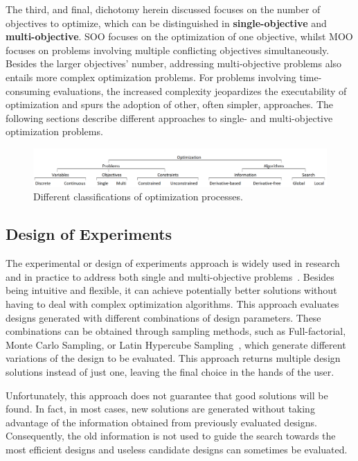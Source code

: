 	The third, and final, dichotomy herein discussed focuses on the number of objectives to optimize, which can be distinguished in \textbf{single-objective} and \textbf{multi-objective}. \ac{SOO} focuses on the optimization of one objective, whilst \ac{MOO} focuses on problems involving multiple conflicting objectives simultaneously. Besides the larger objectives' number, addressing multi-objective problems also entails more complex optimization problems. For problems involving time-consuming evaluations, the increased complexity jeopardizes the executability of optimization and spurs the adoption of other, often simpler, approaches. The following sections describe different approaches to single- and multi-objective optimization problems. 
	
	\begin{figure}
		\centering
		\includegraphics[width=\textwidth]{Images/Background/opt-classifications-h.PNG}
		\caption{Different classifications of optimization processes.}
		\label{fig:optclassification}
	\end{figure}
	
	\subsection{Design of Experiments}
	\label{ssec:doe}
	
	The experimental or design of experiments approach is widely used in research and in practice to address both single and multi-objective problems~\cite{Fang2017}. Besides being intuitive and flexible, it can achieve potentially better solutions without having to deal with complex optimization algorithms. This approach evaluates designs generated with different combinations of design parameters. These combinations can be obtained through sampling methods, such as Full-factorial, Monte Carlo Sampling, or Latin Hypercube Sampling~\cite{Giunta2003DOE}, which generate different variations of the design to be evaluated. This approach returns multiple design solutions instead of just one, leaving the final choice in the hands of the user.
	
	Unfortunately, this approach does not guarantee that good solutions will be found. In fact, in most cases, new solutions are generated without taking advantage of the information obtained from previously evaluated designs. Consequently, the old information is not used to guide the search towards the most efficient designs and useless candidate designs can sometimes be evaluated. 
	
